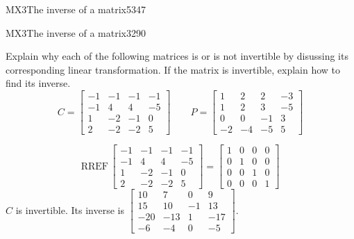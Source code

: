 \begin{exercise}{MX3}{The inverse of a matrix}{5347}
\begin{exerciseAnswer}
 \end{exerciseAnswer}
 \end{exercise}


\begin{exercise}{MX3}{The inverse of a matrix}{3290} 
\begin{exerciseStatement} 

 Explain why each of the following matrices is or is not invertible by disussing its corresponding linear transformation. If the matrix is invertible, explain how to find its inverse. \[
\hspace{2em}
C = \left[\begin{array}{cccc}
-1 & -1 & -1 & -1 \\
-1 & 4 & 4 & -5 \\
1 & -2 & -1 & 0 \\
2 & -2 & -2 & 5
\end{array}\right]
\hspace{2em}
P = \left[\begin{array}{cccc}
1 & 2 & 2 & -3 \\
1 & 2 & 3 & -5 \\
0 & 0 & -1 & 3 \\
-2 & -4 & -5 & 5
\end{array}\right]
\hspace{2em}
        \] 

 \end{exerciseStatement}
 \begin{exerciseAnswer} 

 \[\mathrm{RREF}\,\left[\begin{array}{cccc}
-1 & -1 & -1 & -1 \\
-1 & 4 & 4 & -5 \\
1 & -2 & -1 & 0 \\
2 & -2 & -2 & 5
\end{array}\right]=\left[\begin{array}{cccc}
1 & 0 & 0 & 0 \\
0 & 1 & 0 & 0 \\
0 & 0 & 1 & 0 \\
0 & 0 & 0 & 1
\end{array}\right]\] \(C\) is invertible. Its inverse is \(\left[\begin{array}{cccc}
10 & 7 & 0 & 9 \\
15 & 10 & -1 & 13 \\
-20 & -13 & 1 & -17 \\
-6 & -4 & 0 & -5
\end{array}\right]\). 


\end{exerciseAnswer}
\end{exercise}
